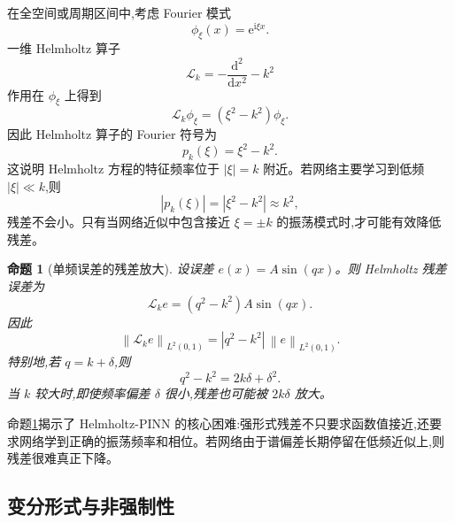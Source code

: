 \documentclass[12pt,hyperref,a4paper,UTF8,twoside]{ctexart}
\newtheorem{proposition}{命题}
\newcommand{\dd}{\mathrm d}
\newcommand{\e}{\mathrm e}
\newcommand{\ii}{\mathrm i}
\newcommand{\calL}{\mathcal L}
\newcommand{\norm}[1]{\left\lVert #1\right\rVert}
\begin{document}
在全空间或周期区间中,考虑 Fourier 模式
\begin{equation}\label{eq:fourier-mode}
    \phi_\xi(x)=\e^{\ii \xi x}.
\end{equation}
一维 Helmholtz 算子
\begin{equation}\label{eq:helmholtz-operator}
    \calL_k=-\frac{\dd^2}{\dd x^2}-k^2
\end{equation}
作用在 $\phi_\xi$ 上得到
\begin{equation}\label{eq:symbol}
    \calL_k\phi_\xi
    =\left(\xi^2-k^2\right)\phi_\xi.
\end{equation}
因此 Helmholtz 算子的 Fourier 符号为
\begin{equation}\label{eq:helmholtz-symbol}
    p_k(\xi)=\xi^2-k^2.
\end{equation}
这说明 Helmholtz 方程的特征频率位于 $|\xi|=k$ 附近。若网络主要学习到低频 $|\xi|\ll k$,则
\begin{equation}\label{eq:low-frequency-symbol}
    |p_k(\xi)|=|\xi^2-k^2|\approx k^2,
\end{equation}
残差不会小。只有当网络近似中包含接近 $\xi=\pm k$ 的振荡模式时,才可能有效降低残差。

\begin{proposition}[单频误差的残差放大]\label{prop:residual-amplification}
设误差 $e(x)=A\sin(qx)$。则 Helmholtz 残差误差为
\begin{equation}\label{eq:residual-single-frequency}
    \calL_k e=(q^2-k^2)A\sin(qx).
\end{equation}
因此
\begin{equation}\label{eq:residual-error-norm}
    \norm{\calL_k e}_{L^2(0,1)}
    =|q^2-k^2|\,\norm{e}_{L^2(0,1)}.
\end{equation}
特别地,若 $q=k+\delta$,则
\begin{equation}\label{eq:phase-frequency-error}
    q^2-k^2=2k\delta+\delta^2.
\end{equation}
当 $k$ 较大时,即使频率偏差 $\delta$ 很小,残差也可能被 $2k\delta$ 放大。
\end{proposition}

命题\ref{prop:residual-amplification}揭示了 Helmholtz-PINN 的核心困难:强形式残差不只要求函数值接近,还要求网络学到正确的振荡频率和相位。若网络由于谱偏差长期停留在低频近似上,则残差很难真正下降。

\subsection{变分形式与非强制性}
\end{document}
